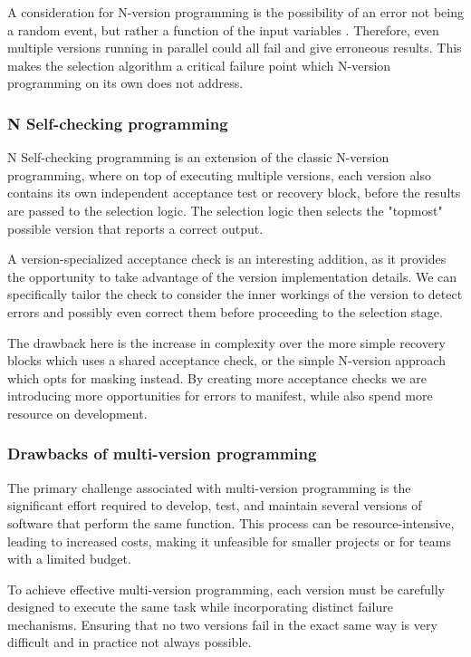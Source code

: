 \documentclass[12pt, letterpaper]{article}
\begin{document}
A consideration for N-version programming is the possibility of an error not being a random event, but rather a function of the input variables \cite{5326}. Therefore, even multiple versions running in parallel could all fail and give erroneous results. This makes the selection algorithm a critical failure point which N-version programming on its own does not address.

\subsubsection{N Self-checking programming}

N Self-checking programming is an extension of the classic N-version programming, where on top of executing multiple versions, each version also contains its own independent acceptance test or recovery block, before the results are passed to the selection logic. The selection logic then selects the "topmost" possible version that reports a correct output.

A version-specialized acceptance check is an interesting addition, as it provides the opportunity to take advantage of the version implementation details. We can specifically tailor the check to consider the inner workings of the version to detect errors and possibly even correct them before proceeding to the selection stage.

The drawback here is the increase in complexity over the more simple recovery blocks which uses a shared acceptance check, or the simple N-version approach which opts for masking instead. By creating more acceptance checks we are introducing more opportunities for errors to manifest, while also spend more resource on development.


\subsubsection{Drawbacks of multi-version programming}

The primary challenge associated with multi-version programming is the significant effort required to develop, test, and maintain several versions of software that perform the same function. This process can be resource-intensive, leading to increased costs, making it unfeasible for smaller projects or for teams with a limited budget.

To achieve effective multi-version programming, each version must be carefully designed to execute the same task while incorporating distinct failure mechanisms. Ensuring that no two versions fail in the exact same way is very difficult and in practice not always possible.
\end{document}
